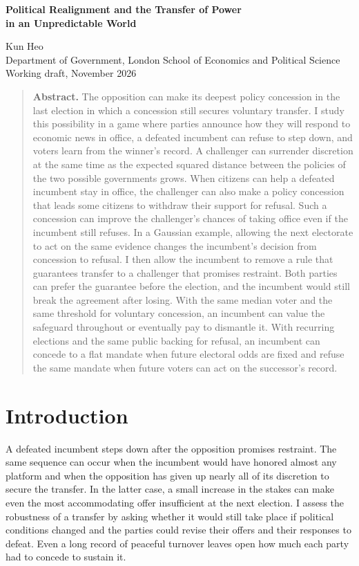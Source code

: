 \documentclass[11pt,letterpaper]{article}
\begin{document}
\thispagestyle{plain}
\begin{center}
{\LARGE\bfseries Political Realignment and the Transfer of Power\\[4pt]
in an Unpredictable World\par}
\vspace{10pt}
{\large Kun Heo}\\[3pt]
Department of Government, London School of Economics and Political Science\\
Working draft, November 2026
\end{center}

\begin{quote}\small
\noindent\textbf{Abstract.} The opposition can make its deepest policy concession in the last election in which a concession still secures voluntary transfer. I study this possibility in a game where parties announce how they will respond to economic news in office, a defeated incumbent can refuse to step down, and voters learn from the winner's record. A challenger can surrender discretion at the same time as the expected squared distance between the policies of the two possible governments grows. When citizens can help a defeated incumbent stay in office, the challenger can also make a policy concession that leads some citizens to withdraw their support for refusal. Such a concession can improve the challenger's chances of taking office even if the incumbent still refuses. In a Gaussian example, allowing the next electorate to act on the same evidence changes the incumbent's decision from concession to refusal. I then allow the incumbent to remove a rule that guarantees transfer to a challenger that promises restraint. Both parties can prefer the guarantee before the election, and the incumbent would still break the agreement after losing. With the same median voter and the same threshold for voluntary concession, an incumbent can value the safeguard throughout or eventually pay to dismantle it. With recurring elections and the same public backing for refusal, an incumbent can concede to a flat mandate when future electoral odds are fixed and refuse the same mandate when future voters can act on the successor's record.
\end{quote}

\section{Introduction}\label{sec:intro}

A defeated incumbent steps down after the opposition promises restraint. The same sequence can occur when the incumbent would have honored almost any platform and when the opposition has given up nearly all of its discretion to secure the transfer. In the latter case, a small increase in the stakes can make even the most accommodating offer insufficient at the next election. I assess the robustness of a transfer by asking whether it would still take place if political conditions changed and the parties could revise their offers and their responses to defeat. Even a long record of peaceful turnover leaves open how much each party had to concede to sustain it.
\end{document}
